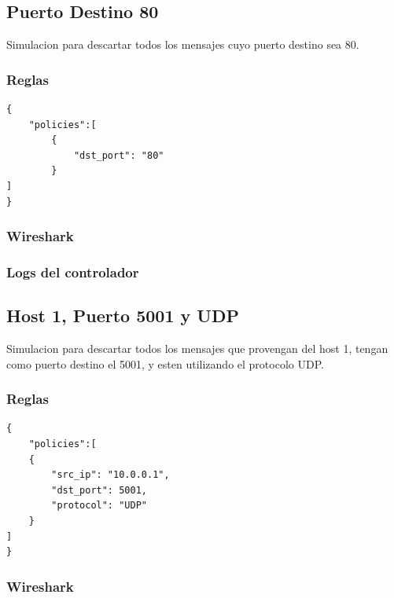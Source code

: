 \documentclass{article}
\begin{document}
\subsection{Puerto Destino 80}
Simulacion para descartar todos los mensajes cuyo puerto destino sea 80.

\subsubsection{Reglas}
\begin{center}
\end{center}

\begin{verbatim}
{
    "policies":[
        {
            "dst_port": "80"
        }
]
}
\end{verbatim}


\subsubsection{Wireshark}
\begin{center}
\end{center}

\subsubsection{Logs del controlador}
\begin{center}
\end{center}


\subsection{Host 1, Puerto 5001 y UDP}
Simulacion para descartar todos los mensajes que provengan del host 1, tengan como puerto destino el 5001, y esten utilizando el protocolo UDP.

\subsubsection{Reglas}

\begin{verbatim}
{
    "policies":[
    {
        "src_ip": "10.0.0.1",
        "dst_port": 5001,
        "protocol": "UDP"
    }
]
}
\end{verbatim}

\subsubsection{Wireshark}
\begin{center}
\end{center}
\end{document}
